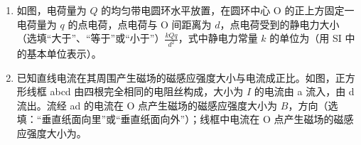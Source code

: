 \documentclass[\gkver]{gaokaozhenti}
\begin{document}
\begin{enumerate}
{磁场方向竖直向下，磁感应强度增大时，穿过圆环向下的磁通量增大。由楞次定律可知，感应电流的磁场在环内应竖直向上，由安培定则可知，从上往下看，感应电流沿逆时针方向。

磁场只分布在半径为 $r$ 的圆形区域内，穿过圆环的磁通量大小为 $\Phi = B\pi r^{2}$。磁场方向改变 $180^{\circ}$ 前后，磁通量大小不变、方向相反，所以磁通量的变化量大小为

$\Delta\Phi = B\pi r^{2} - (-B\pi r^{2}) = 2B\pi r^{2}$
}

\item
如图，电荷量为 $Q$ 的均匀带电圆环水平放置，在圆环中心 O 的正上方固定一电荷量为 $q$ 的点电荷，点电荷与 O 间距离为 $d$，点电荷受到的静电力大小（选填“大于”、“等于”或“小于”）$\frac{kQq}{d^{2}}$，式中静电力常量 $k$ 的单位为\tkanswer[4cm]{$\UkgmcmsqAq$}（用 SI 中的基本单位表示）。
\onepicture[w=3cm, align=right]{}

\item
已知直线电流在其周围产生磁场的磁感应强度大小与电流成正比。如图，正方形线框 abcd 由四根完全相同的电阻丝构成，大小为 $I$ 的电流由 a 流入，由 d 流出。流经 ad 的电流在 O 点产生磁场的磁感应强度大小为 $B$，方向（选填：“垂直纸面向里”或“垂直纸面向外”）；线框中电流在 O 点产生磁场的磁感应强度大小为。
\onepicture[w=3.2cm, align=right]{}
\end{enumerate}
\end{document}
